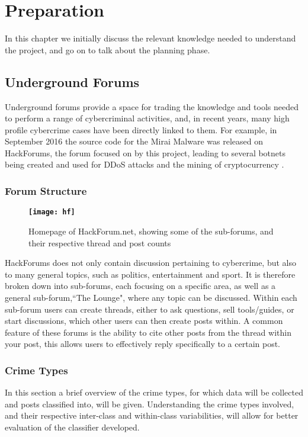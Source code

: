 \documentclass[12pt,a4paper,twoside,openright]{report}
\begin{document}
\chapter{Preparation}
In this chapter we initially discuss the relevant knowledge needed to understand the project, and go on to talk about the planning phase.

\section{Underground Forums}
Underground forums provide a space for trading the knowledge and tools needed to perform a range of cybercriminal activities, and, in recent years, many high profile cybercrime cases have been directly linked to them. For example, in September 2016 the source code for the Mirai Malware \cite{203628} was released on HackForums, the forum focused on by this project, leading to several botnets being created and used for DDoS attacks and the mining of cryptocurrency \cite{mirai-cc}. 

\subsection{Forum Structure}
\begin{figure}[h]
    \centering
    \begin{minipage}{1\textwidth}
        \centering\textbf{
        \texttt{[image: hf]}}
        \caption{Homepage of HackForum.net, showing some of the sub-forums, and their respective thread and post counts}\label{Fig:Data1}
        \label{fig:slam}
    \end{minipage}\hfill
\end{figure}
HackForums does not only contain discussion pertaining to cybercrime, but also to many general topics, such as politics, entertainment and sport. It is therefore broken down into sub-forums, each focusing on a specific area, as well as a general sub-forum,``The Lounge", where any topic can be discussed. Within each sub-forum users can create threads, either to ask questions, sell tools/guides, or start discussions, which other users can then create posts within. A common feature of these forums is the ability to cite other posts from the thread within your post, this allows users to effectively reply specifically to a certain post. 

\subsection{Crime Types} \label{section:crimetypes}
In this section a brief overview of the crime types, for which data will be collected and posts classified into, will be given. Understanding the crime types involved, and their respective inter-class and within-class variabilities, will allow for better evaluation of the classifier developed.
\end{document}
